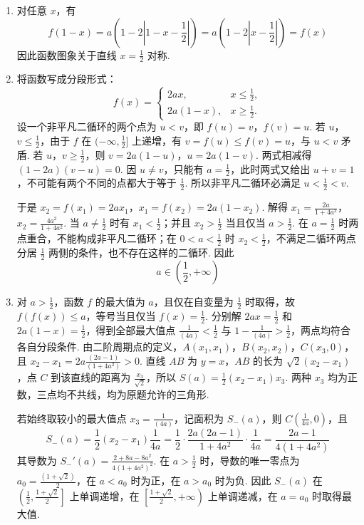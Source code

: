 \begin{solution}
\begin{enumerate}
\item 对任意 \(x\)，有
\[
f(1-x)
=a\left(1-2\left|1-x-\frac12\right|\right)
=a\left(1-2\left|x-\frac12\right|\right)
=f(x)
\]
因此函数图象关于直线 \(x=\frac{1}{2}\) 对称.

\item 将函数写成分段形式：
\[
f(x)=
\begin{cases}
2ax,&x\leqslant\frac12,\\
2a(1-x),&x\geqslant\frac12.
\end{cases}
\]
设一个非平凡二循环的两个点为 \(u<v\)，即 \(f(u)=v\)，\(f(v)=u\). 若 \(u\)，\(v\leqslant\frac{1}{2}\)，由于 \(f\) 在 \((-\infty,\frac{1}{2}]\) 上递增，有 \(v=f(u)\leqslant f(v)=u\)，与 \(u<v\) 矛盾. 若 \(u\)，\(v\geqslant\frac{1}{2}\)，则
\(v=2a(1-u)\)，\(u=2a(1-v)\).
两式相减得 \((1-2a)(v-u)=0\). 因 \(u\ne v\)，只能有 \(a=\frac{1}{2}\)，此时两式又给出 \(u+v=1\)，不可能有两个不同的点都大于等于 \(\frac{1}{2}\). 所以非平凡二循环必满足 \(u<\frac{1}{2}<v\).

于是
\(x_2=f(x_1)=2ax_1\)，\(x_1=f(x_2)=2a(1-x_2)\).
解得
\(x_1=\frac{2a}{1+4a^2}\)，\(x_2=\frac{4a^2}{1+4a^2}\).
当 \(a\ne\frac{1}{2}\) 时有 \(x_1<\frac{1}{2}\)；并且 \(x_2>\frac{1}{2}\) 当且仅当 \(a>\frac{1}{2}\). 在 \(a=\frac{1}{2}\) 时两点重合，不能构成非平凡二循环；在 \(0<a<\frac{1}{2}\) 时 \(x_2<\frac{1}{2}\)，不满足二循环两点分居 \(\frac{1}{2}\) 两侧的条件，也不存在这样的二循环. 因此
\[
a\in\left(\frac12,+\infty\right)
\]

\item 对 \(a>\frac{1}{2}\)，函数 \(f\) 的最大值为 \(a\)，且仅在自变量为 \(\frac{1}{2}\) 时取得，故 \(f(f(x))\leqslant a\)，等号当且仅当 \(f(x)=\frac{1}{2}\). 分别解 \(2ax=\frac{1}{2}\) 和 \(2a(1-x)=\frac{1}{2}\)，得到全部最大值点 \(\frac{1}{(4a)}<\frac{1}{2}\) 与 \(1-\frac{1}{(4a)}>\frac{1}{2}\)，两点均符合各自分段条件.
由二阶周期点的定义，\(A(x_1,x_1)\)，\(B(x_2,x_2)\)，\(C(x_3,0)\)，且 \(x_2-x_1=2a\frac{(2a-1)}{(1+4a^2)}>0\). 直线 \(AB\) 为 \(y=x\)，\(AB\) 的长为 \(\sqrt2(x_2-x_1)\)，点 \(C\) 到该直线的距离为 \(\frac{x_3}{\sqrt2}\)，所以 \(S(a)=\frac12(x_2-x_1)x_3\). 两种 \(x_3\) 均为正数，三点均不共线，均为原题允许的三角形.

若始终取较小的最大值点 \(x_3=\frac{1}{(4a)}\)，记面积为 \(S_-(a)\)，则 \(C\left(\frac1{4a},0\right)\)，且
\[
S_-(a)=\frac12(x_2-x_1)\frac1{4a}
=\frac12\cdot\frac{2a(2a-1)}{1+4a^2}\cdot\frac1{4a}
=\frac{2a-1}{4(1+4a^2)}
\]
其导数为 \(S_-'(a)=\frac{2+8a-8a^2}{4(1+4a^2)^2}\). 在 \(a>\frac{1}{2}\) 时，导数的唯一零点为 \(a_0=\frac{(1+\sqrt2)}{2}\)，在 \(a<a_0\) 时为正，在 \(a>a_0\) 时为负. 因此 \(S_-(a)\) 在 \(\left(\frac12,\frac{1+\sqrt2}{2}\right]\) 上单调递增，在 \(\left[\frac{1+\sqrt2}{2},+\infty\right)\) 上单调递减，在 \(a=a_0\) 时取得最大值.


\end{enumerate}
\end{solution}
